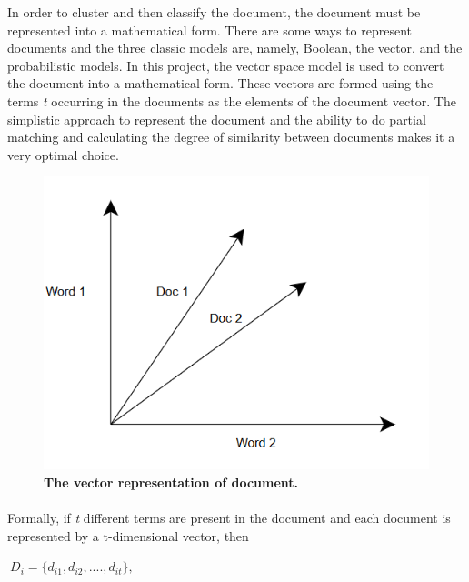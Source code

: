 \documentclass[12pt]{report}
\begin{document}
        In order to cluster and then classify the document, the document must be represented into a mathematical form. There are some ways to represent documents and the three classic models are, namely, 
        Boolean, the vector, and the probabilistic models\cite{baeza1999modern}. In this project, the vector space model is used\cite{salton1975vector} to convert the document into a mathematical form. These vectors are formed using the terms \emph{t} occurring in the documents 
        as the elements of the document vector. The simplistic approach to represent the document and the ability to do partial matching and calculating the degree
        of similarity between documents makes it a very optimal choice. 
        \begin{figure}[h]
            \centering
            \includegraphics[scale=0.7]{vectorrep.png}
            \caption{\textbf{The vector representation of document.}}
        \end{figure}
        \paragraph{}Formally, if \emph{t} different terms are present in the document and each document is represented by a t-dimensional vector, then 
        
        \begin{center}
            
          $~{D_i = \{d_{i1}, d_{i2},....,d_{it}\} ,}~$ 
        
        \end{center} 
        
\end{document}
